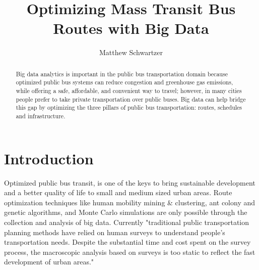 \documentclass[sigconf]{acmart}
\begin{document}
\title{Optimizing Mass Transit Bus Routes with Big Data}


\author{Matthew Schwartzer}


\begin{abstract}
Big data analytics is important in the public bus transportation domain because optimized public bus systems can reduce congestion and greenhouse gas emissions, while offering a safe, affordable, and convenient way to travel; however, in many cities people prefer to take private transportation over public buses. Big data can help bridge this gap by optimizing the three pillars of public bus transportation: routes, schedules and infrastructure. 


\end{abstract}



\maketitle

\section{Introduction}

Optimized public bus transit, is one of the keys to bring sustainable development and a better quality of life to small and medium sized urban areas. Route optimization techniques like human mobility mining \& clustering, ant colony and genetic algorithms, and Monte Carlo simulations are only possible through the collection and analysis of big data. Currently "traditional public transportation planning methods have relied on human surveys to understand people's transportation needs. Despite the substantial time and cost spent on the survey process, the macroscopic analysis based on surveys is too static to reflect the fast development of urban areas\cite{Liu01}." 
\end{document}
